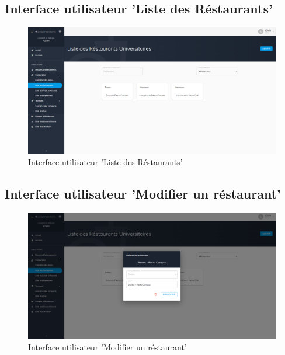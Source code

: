    \subsection{Interface utilisateur 'Liste des Réstaurants'}
    \begin{figure}[H]
        \centering
        \includegraphics[scale=0.21]{PFE Screens/Admin/Restauration/Restos/Restos.jpg}
        \caption{Interface utilisateur 'Liste des Réstaurants'}
    \end{figure}

    \subsection{Interface utilisateur 'Modifier un réstaurant'}
    \begin{figure}[H]
        \centering
        \includegraphics[scale=0.21]{PFE Screens/Admin/Restauration/Restos/Modif - Resto.jpg}
        \caption{Interface utilisateur 'Modifier un réstaurant'}
    \end{figure}


